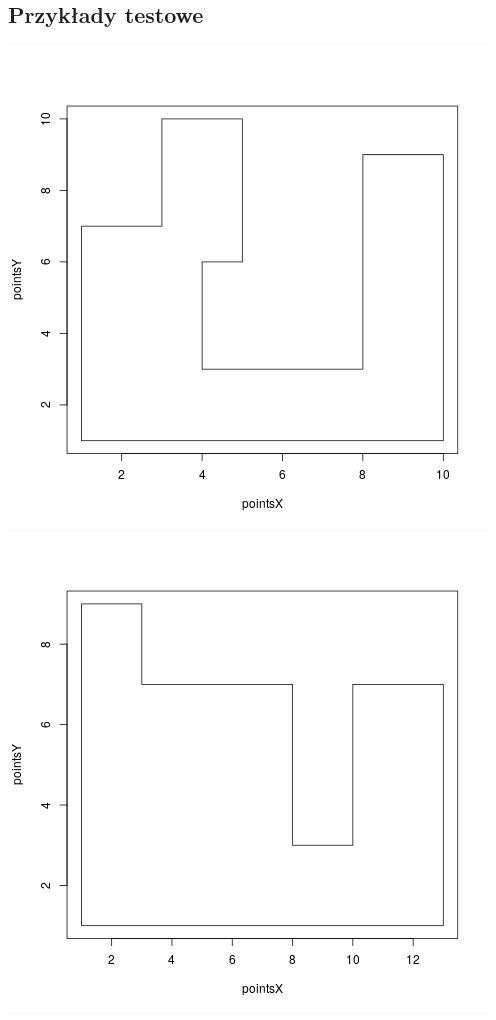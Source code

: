 \documentclass[12pt,a4paper]{article}
\begin{document}
\subsection{Przykłady testowe}
\includegraphics[scale=0.4]{mediumMap.png}
\includegraphics[scale=0.4]{mediumMap2.png} \\
\end{document}
